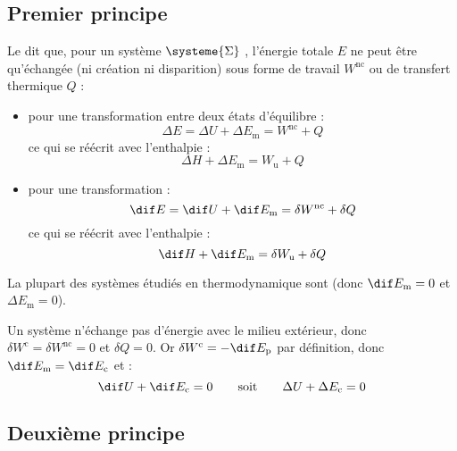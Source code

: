 \subsection{Premier principe}

\begin{definition}
Le  dit que, pour un système $\systeme{\Sigma}$ , l'énergie totale $E$ ne peut être qu'échangée (ni création ni disparition) sous forme de travail $W^{\mathrm{nc}}$ ou de transfert thermique $Q$ :
\begin{itemize}
\item pour une transformation entre deux états d'équilibre :
\[\Delta E = \Delta U + \Delta E_{\mathrm{m}} = W^{\mathrm{nc}} + Q\]
ce qui se réécrit avec l'enthalpie :
\[\Delta H + \Delta E_{\mathrm{m}} = W_{\mathrm{u}} + Q\]

\item pour une transformation  :
\[\dif E = \dif U + \dif E_{\mathrm{m}} = \delta W^{\mathrm{nc}} + \delta Q\]
ce qui se réécrit avec l'enthalpie :
\[\dif H + \dif E_{\mathrm{m}} = \delta W_{\mathrm{u}} + \delta Q\]
\end{itemize}
\end{definition}

\begin{remarque}
La plupart des systèmes étudiés en thermodynamique sont  (donc $\dif E_{\mathrm{m}} = 0$ et $\Delta E_{\mathrm{m}} = 0$).
\end{remarque}

\begin{propriete}
Un système  n'échange pas d'énergie avec le milieu extérieur, donc $\delta W^{\mathrm{c}} = \delta W^{\mathrm{nc}} = 0$ et $\delta Q = 0$. Or $\delta W^{\mathrm{c}} = -\dif E_{\mathrm{p}}$ par définition, donc $\dif E_{\mathrm{m}} = \dif E_{\mathrm{c}}$ et :
\[\dif U + \dif E_{\mathrm{c}} = 0 \qquad \text{soit} \qquad \Delta U + \Delta E_{\mathrm{c}} = 0\]
\end{propriete}



\subsection{Deuxième principe}

